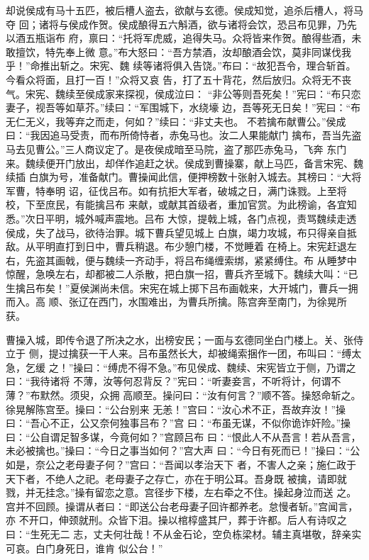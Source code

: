 却说侯成有马十五匹，被后槽人盗去，欲献与玄德。侯成知觉，追杀后槽人，将马夺
回；诸将与侯成作贺。侯成酿得五六斛酒，欲与诸将会饮，恐吕布见罪，乃先以酒五瓶诣布
府，禀曰：“托将军虎威，追得失马。众将皆来作贺。酿得些酒，未敢擅饮，特先奉上微
意。”布大怒曰：“吾方禁酒，汝却酿酒会饮，莫非同谋伐我乎！”命推出斩之。宋宪、魏
续等诸将俱入告饶。”布曰：“故犯吾令，理合斩首。今看众将面，且打一百！”众将又哀
告，打了五十背花，然后放归。众将无不丧气。宋宪、魏续至侯成家来探视，侯成泣曰：
“非公等则吾死矣！”宪曰：“布只恋妻子，视吾等如草芥。”续曰：“军围城下，水绕壕
边，吾等死无日矣！”宪曰：“布无仁无义，我等弃之而走，何如？”续曰：“非丈夫也。
不若擒布献曹公。”侯成曰：“我因追马受责，而布所倚恃者，赤兔马也。汝二人果能献门
擒布，吾当先盗马去见曹公。”三人商议定了。是夜侯成暗至马院，盗了那匹赤兔马，飞奔
东门来。魏续便开门放出，却佯作追赶之状。侯成到曹操寨，献上马匹，备言宋宪、魏续插
白旗为号，准备献门。曹操闻此信，便押榜数十张射入城去。其榜曰：“大将军曹，特奉明
诏，征伐吕布。如有抗拒大军者，破城之日，满门诛戮。上至将校，下至庶民，有能擒吕布
来献，或献其首级者，重加官赏。为此榜谕，各宜知悉。”次日平明，城外喊声震地。吕布
大惊，提戟上城，各门点视，责骂魏续走透侯成，失了战马，欲待治罪。城下曹兵望见城上
白旗，竭力攻城，布只得亲自抵敌。从平明直打到日中，曹兵稍退。布少憩门楼，不觉睡着
在椅上。宋宪赶退左右，先盗其画戟，便与魏续一齐动手，将吕布绳缠索绑，紧紧缚住。布
从睡梦中惊醒，急唤左右，却都被二人杀散，把白旗一招，曹兵齐至城下。魏续大叫：“已
生擒吕布矣！”夏侯渊尚未信。宋宪在城上掷下吕布画戟来，大开城门，曹兵一拥而入。高
顺、张辽在西门，水围难出，为曹兵所擒。陈宫奔至南门，为徐晃所获。

曹操入城，即传令退了所决之水，出榜安民；一面与玄德同坐白门楼上。关、张侍立于
侧，提过擒获一干人来。吕布虽然长大，却被绳索捆作一团，布叫曰：“缚太急，乞缓
之！”操曰：“缚虎不得不急。”布见侯成、魏续、宋宪皆立于侧，乃谓之曰：“我待诸将
不薄，汝等何忍背反？”宪曰：“听妻妾言，不听将计，何谓不薄？”布默然。须臾，众拥
高顺至。操问曰：“汝有何言？”顺不答。操怒命斩之。徐晃解陈宫至。操曰：“公台别来
无恙！”宫曰：“汝心术不正，吾故弃汝！”操曰：“吾心不正，公又奈何独事吕布？”宫
曰：“布虽无谋，不似你诡诈奸险。”操曰：“公自谓足智多谋，今竟何如？”宫顾吕布
曰：“恨此人不从吾言！若从吾言，未必被擒也。”操曰：“今日之事当如何？”宫大声
曰：“今日有死而已！”操曰：“公如是，奈公之老母妻子何？”宫曰：“吾闻以孝治天下
者，不害人之亲；施仁政于天下者，不绝人之祀。老母妻子之存亡，亦在于明公耳。吾身既
被擒，请即就戮，并无挂念。”操有留恋之意。宫径步下楼，左右牵之不住。操起身泣而送
之。宫并不回顾。操谓从者曰：“即送公台老母妻子回许都养老。怠慢者斩。”宫闻言，亦
不开口，伸颈就刑。众皆下泪。操以棺椁盛其尸，葬于许都。后人有诗叹之曰：“生死无二
志，丈夫何壮哉！不从金石论，空负栋梁材。辅主真堪敬，辞亲实可哀。白门身死日，谁肯
似公台！”

